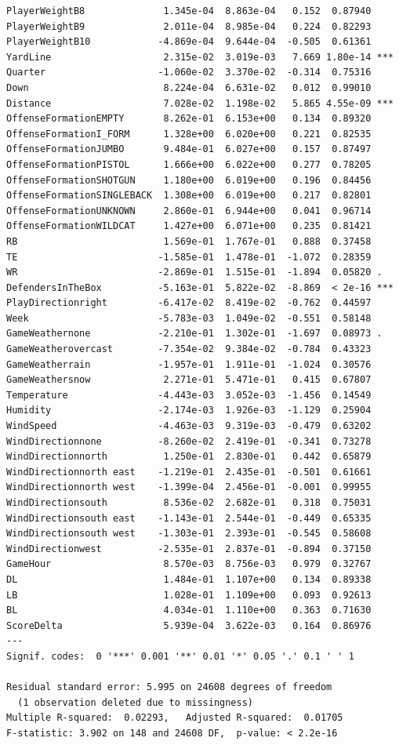 \documentclass[
  super,
  preprint,
  3p]{elsarticle}
\begin{document}
\begin{verbatim}
PlayerWeightB8              1.345e-04  8.863e-04   0.152  0.87940    
PlayerWeightB9              2.011e-04  8.985e-04   0.224  0.82293    
PlayerWeightB10            -4.869e-04  9.644e-04  -0.505  0.61361    
YardLine                    2.315e-02  3.019e-03   7.669 1.80e-14 ***
Quarter                    -1.060e-02  3.370e-02  -0.314  0.75316    
Down                        8.224e-04  6.631e-02   0.012  0.99010    
Distance                    7.028e-02  1.198e-02   5.865 4.55e-09 ***
OffenseFormationEMPTY       8.262e-01  6.153e+00   0.134  0.89320    
OffenseFormationI_FORM      1.328e+00  6.020e+00   0.221  0.82535    
OffenseFormationJUMBO       9.484e-01  6.027e+00   0.157  0.87497    
OffenseFormationPISTOL      1.666e+00  6.022e+00   0.277  0.78205    
OffenseFormationSHOTGUN     1.180e+00  6.019e+00   0.196  0.84456    
OffenseFormationSINGLEBACK  1.308e+00  6.019e+00   0.217  0.82801    
OffenseFormationUNKNOWN     2.860e-01  6.944e+00   0.041  0.96714    
OffenseFormationWILDCAT     1.427e+00  6.071e+00   0.235  0.81421    
RB                          1.569e-01  1.767e-01   0.888  0.37458    
TE                         -1.585e-01  1.478e-01  -1.072  0.28359    
WR                         -2.869e-01  1.515e-01  -1.894  0.05820 .  
DefendersInTheBox          -5.163e-01  5.822e-02  -8.869  < 2e-16 ***
PlayDirectionright         -6.417e-02  8.419e-02  -0.762  0.44597    
Week                       -5.783e-03  1.049e-02  -0.551  0.58148    
GameWeathernone            -2.210e-01  1.302e-01  -1.697  0.08973 .  
GameWeatherovercast        -7.354e-02  9.384e-02  -0.784  0.43323    
GameWeatherrain            -1.957e-01  1.911e-01  -1.024  0.30576    
GameWeathersnow             2.271e-01  5.471e-01   0.415  0.67807    
Temperature                -4.443e-03  3.052e-03  -1.456  0.14549    
Humidity                   -2.174e-03  1.926e-03  -1.129  0.25904    
WindSpeed                  -4.463e-03  9.319e-03  -0.479  0.63202    
WindDirectionnone          -8.260e-02  2.419e-01  -0.341  0.73278    
WindDirectionnorth          1.250e-01  2.830e-01   0.442  0.65879    
WindDirectionnorth east    -1.219e-01  2.435e-01  -0.501  0.61661    
WindDirectionnorth west    -1.399e-04  2.456e-01  -0.001  0.99955    
WindDirectionsouth          8.536e-02  2.682e-01   0.318  0.75031    
WindDirectionsouth east    -1.143e-01  2.544e-01  -0.449  0.65335    
WindDirectionsouth west    -1.303e-01  2.393e-01  -0.545  0.58608    
WindDirectionwest          -2.535e-01  2.837e-01  -0.894  0.37150    
GameHour                    8.570e-03  8.756e-03   0.979  0.32767    
DL                          1.484e-01  1.107e+00   0.134  0.89338    
LB                          1.028e-01  1.109e+00   0.093  0.92613    
BL                          4.034e-01  1.110e+00   0.363  0.71630    
ScoreDelta                  5.939e-04  3.622e-03   0.164  0.86976    
---
Signif. codes:  0 '***' 0.001 '**' 0.01 '*' 0.05 '.' 0.1 ' ' 1

Residual standard error: 5.995 on 24608 degrees of freedom
  (1 observation deleted due to missingness)
Multiple R-squared:  0.02293,   Adjusted R-squared:  0.01705 
F-statistic: 3.902 on 148 and 24608 DF,  p-value: < 2.2e-16
\end{verbatim}
\end{document}

